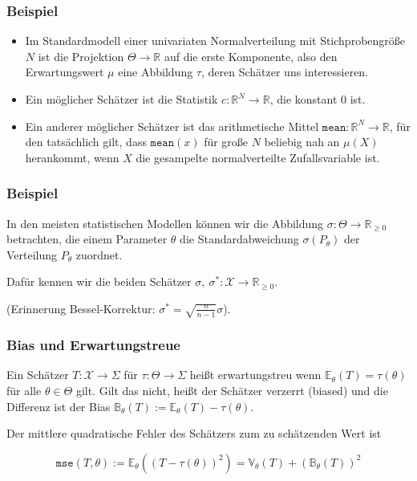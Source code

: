       \begin{frame}
        \frametitle{Beispiel}
        \begin{itemize}
          \item
Im Standardmodell einer univariaten Normalverteilung mit Stichprobengröße $N$ ist die Projektion $\Theta \to \mathbb{R}$ auf die erste Komponente, also den Erwartungswert $\mu$ eine Abbildung $\tau$, deren Schätzer uns interessieren.
\item
  Ein möglicher Schätzer ist die Statistik $c \colon \mathbb{R}^N \to \mathbb{R}$, die konstant $0$ ist.
\item
Ein anderer möglicher Schätzer ist das arithmetische Mittel $\texttt{mean} \colon \mathbb{R}^N \to \mathbb{R}$, für den tatsächlich gilt, dass $\texttt{mean}(x)$ für große $N$ beliebig nah an $\mu(X)$ herankommt, wenn $X$ die gesampelte normalverteilte Zufallsvariable ist.
\end{itemize}
  \end{frame}


      \begin{frame}
    \frametitle{Beispiel}
    In den meisten statistischen Modellen können wir die Abbildung $\sigma \colon \Theta \to \mathbb{R}_{\geq 0}$ betrachten, die einem Parameter $\theta$ die Standardabweichung $\sigma(P_\theta)$ der Verteilung $P_\theta$ zuordnet.

    Dafür kennen wir die beiden Schätzer $\sigma,\ \sigma^\ast \colon \mathcal{X} \to \mathbb{R}_{\geq 0}$.

    \vspace{1cm}
    (Erinnerung Bessel-Korrektur: $\sigma^\ast = \sqrt{\frac{n}{n-1}} \sigma$).
  \end{frame}


      \begin{frame}
    \frametitle{Bias und Erwartungstreue}
\begin{definition}
Ein Schätzer $T \colon \mathcal{X} \to \Sigma$ für $\tau \colon \Theta \to \Sigma$ heißt \alert{erwartungstreu} wenn $\mathbb{E}_{\theta}( T ) = \tau(\theta)$ für alle $\theta \in \Theta$ gilt. Gilt das nicht, heißt der Schätzer \alert{verzerrt} (biased) und die Differenz ist der \alert{Bias} $\mathbb{B}_\theta(T) := \mathbb{E}_{\theta}( T ) - \tau(\theta)$.
\end{definition}

\begin{definition}
Der \alert{mittlere quadratische Fehler} des Schätzers zum zu schätzenden Wert ist

$$
\texttt{mse}(T,\theta) := \mathbb{E}_\theta\left ( (T-\tau(\theta))^2 \right ) = \mathbb{V}_\theta(T) + (\mathbb{B}_\theta(T))^2
$$
\end{definition}


  \end{frame}


